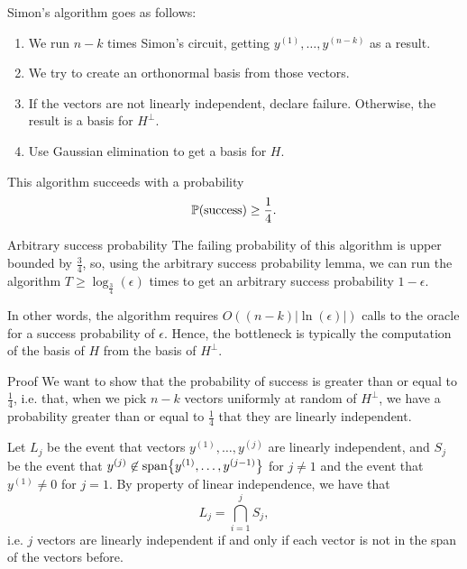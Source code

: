 \documentclass[a4paper]{article}
\begin{document}
\begin{parag}{Simon's algorithm}
     goes as follows:
    \begin{enumerate}
        \item We run $n-k$ times Simon's circuit, getting $y^{\left(1\right)}, \ldots, y^{\left(n-k\right)}$ as a result.
        \item We try to create an orthonormal basis from those vectors. 
        \item If the vectors are not linearly independent, declare failure. Otherwise, the result is a basis for $H^{\perp}$.
        \item Use Gaussian elimination to get a basis for $H$.
    \end{enumerate}

    This algorithm succeeds with a probability 
    \[\prob\left(\text{success}\right) \geq \frac{1}{4}.\]
    
    \begin{subparag}{Arbitrary success probability}
        The failing probability of this algorithm is upper bounded by $\frac{3}{4}$, so, using the arbitrary success probability lemma, we can run the algorithm $T \geq \log_{\frac{3}{4}}\left(\epsilon\right)$ times to get an arbitrary success probability $1 - \epsilon$.

        In other words, the algorithm requires $O\left(\left(n-k\right) \left|\ln\left(\epsilon\right)\right|\right)$ calls to the oracle for a success probability of $\epsilon$. Hence, the bottleneck is typically the computation of the basis of $H$ from the basis of $H^{\perp}$.
    \end{subparag}
    
    \begin{subparag}{Proof}
        We want to show that the probability of success is greater than or equal to $\frac{1}{4}$, i.e. that, when we pick $n - k$ vectors uniformly at random of $H^{\perp}$, we have a probability greater than or equal to $\frac{1}{4}$ that they are linearly independent.

        Let $L_j$ be the event that vectors $y^{\left(1\right)}, \ldots, y^{\left(j\right)}$ are linearly independent, and $S_j$ be the event that $y^{\left(j\right)} \not\in \Span\left\{y^{\left(1\right)}, \ldots, y^{\left(j-1\right)}\right\}$ for $j \neq 1$ and the event that $y^{\left(1\right)} \neq 0$ for $j = 1$. By property of linear independence, we have that 
        \[L_j = \bigcap_{i=1}^{j} S_j,\]
        i.e. $j$ vectors are linearly independent if and only if each vector is not in the span of the vectors before.


\end{subparag}
\end{parag}
\end{document}
